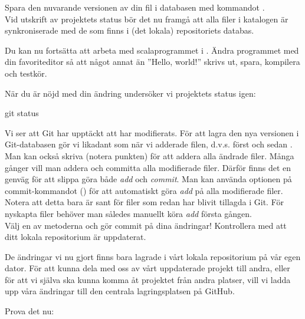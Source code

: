 \begin{Datorarbete}
	\code{[\ref{git-commit}]} Spara den nuvarande versionen av din fil i databasen med kommandot .
	\\


	Vid utskrift av projektets status bör det nu framgå att alla filer i katalogen är synkroniserade med de som finns i (det lokala) repositoriets databas.

	Du kan nu fortsätta att arbeta med scalaprogrammet i . Ändra programmet med din favoriteditor så att något annat än ''Hello, world!'' skrivs ut, spara, kompilera och testkör.

	När du är nöjd med din ändring undersöker vi projektets status igen:

	\begin{Code}
		git status
	\end{Code}

	Vi ser att Git har upptäckt att  har modifierats. För att lagra den nya versionen i Git-databasen gör vi likadant som när vi adderade filen, d.v.s. först  och sedan . Man kan också skriva   (notera punkten) för att addera alla ändrade filer.	Många gånger vill man addera och committa alla modifierade filer. Därför finns det en genväg för att slippa göra både \emph{add} och \emph{commit}. Man kan använda optionen  på commit-kommandot () för att automatiskt göra \emph{add} på alla modifierade filer. Notera att detta bara är sant för filer som redan har blivit tillagda i Git. För nyskapta filer behöver man således manuellt köra \emph{add} första gången.
	\\

	\code{[\ref{git-commit-a}]} Välj en av metoderna och gör commit på dina ändringar! Kontrollera med  att ditt lokala repositorium är uppdaterat.
	\\

	\item De ändringar vi nu gjort finns bara lagrade i vårt lokala repositorium på vår egen dator. För att kunna dela med oss av vårt uppdaterade projekt till andra, eller för att vi själva ska kunna komma åt projektet från andra platser, vill vi ladda upp våra ändringar till den centrala lagringsplatsen på GitHub.

	Prova det nu:


\end{Datorarbete}
